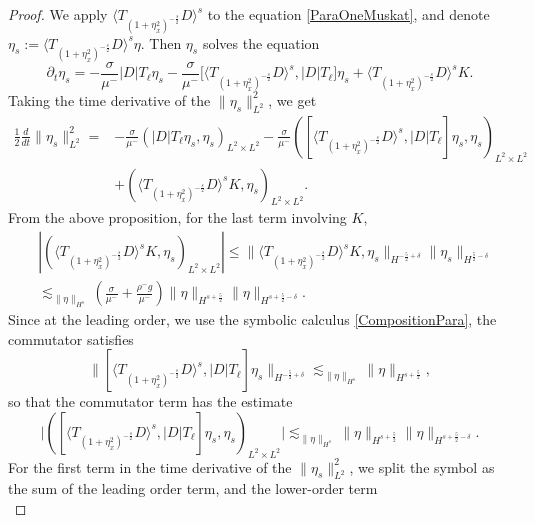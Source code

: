\documentclass[12pt]{amsart}
\theoremstyle{definition}
\numberwithin{equation}{section}
\newcommand{\p}{\partial}
\newcommand{\f}{\frac}
\begin{document}
\begin{proof}
We apply $\langle T_{(1+\eta_x^2)^{-\frac{s}{2}}}D\rangle^s$ to the equation \eqref{ParaOneMuskat}, and denote $\eta_s := \langle T_{(1+\eta_x^2)^{-\frac{s}{2}}}D\rangle^s \eta$.
Then $\eta_s$ solves the equation
\begin{equation*} 
     \p_t \eta_s = -\frac{\sigma}{\mu^{-}} |D|T_\ell \eta_s -\frac{\sigma}{\mu^{-}}\big[\langle T_{(1+\eta_x^2)^{-\frac{s}{2}}}D \rangle^s, |D|T_\ell \big] \eta_s +  \langle T_{(1+\eta_x^2)^{-\frac{s}{2}}}D\rangle^sK.
\end{equation*}
Taking the time derivative of the $\|\eta_s\|_{L^2}^2$, we get 
\begin{align*}
 \f12\frac{d}{dt} \|\eta_s\|_{L^2}^2 =& -\frac{\sigma}{\mu^{-}} (|D|T_\ell \eta_s, \eta_s)_{L^2 \times L^2} - \frac{\sigma}{\mu^{-}} ([\langle T_{(1+\eta_x^2)^{-\frac{s}{2}}}D \rangle^s, |D|T_\ell] \eta_s, \eta_s)_{L^2 \times L^2} \\
 &+ (\langle T_{(1+\eta_x^2)^{-\frac{s}{2}}}D\rangle^sK, \eta_s)_{L^2 \times L^2}.
\end{align*}
From the above proposition, for the last term involving $K$,
\begin{align*}
&\left|(\langle T_{(1+\eta_x^2)^{-\frac{s}{2}}}D\rangle^sK, \eta_s)_{L^2 \times L^2}\right|
\leq\|\langle T_{(1+\eta_x^2)^{-\frac{s}{2}}}D\rangle^sK, \eta_s\|_{H^{-\f52+\delta}}\|\eta_s\|_{H^{\f52-\delta}}\\
&\lesssim_{\|\eta\|_{H^s}}\left(\frac{\sigma}{\mu^{-}}   + \frac{\rho^- g}{\mu^-}\right)\|\eta\|_{H^{s+\f52}}\| \eta\|_{H^{s+\f52-\delta}}.
\end{align*}
Since at the leading order,  we use the symbolic calculus \eqref{CompositionPara}, the commutator satisfies
\begin{equation*}
 \big\|[\langle T_{(1+\eta_x^2)^{-\frac{s}{2}}}D \rangle^s, |D|T_\ell] \eta_s \big\|_{H^{-\f52+\delta}} \lesssim_{\|\eta\|_{H^s}} \|\eta\|_{H^{s+\f52}},
\end{equation*}
so that the commutator term has the estimate
\begin{equation*}
\big| ([\langle T_{(1+\eta_x^2)^{-\frac{s}{2}}}D \rangle^s, |D|T_\ell] \eta_s, \eta_s)_{L^2 \times L^2}\big| \lesssim_{\|\eta\|_{H^s}}\|\eta\|_{H^{s+\f52}}\| \eta\|_{H^{s+\f52-\delta}}.
\end{equation*}
For the first term in the time derivative of the $\|\eta_s\|_{L^2}^2$, we split the symbol as the sum of the leading order term, and the lower-order term 
\begin{equation*}

\end{equation*}
\end{proof}
\end{document}
